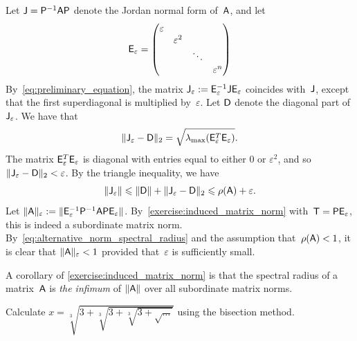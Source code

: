 \begin{solution}
    Let $\mathsf J = \mathsf P^{-1} \mathsf A \mathsf P$ denote the Jordan normal form of~$\mathsf A$,
    and let
    \[
        \mathsf E_{\varepsilon} =
        \begin{pmatrix}
            \varepsilon \\
        & \varepsilon^{2} &  \\
        & & \ddots & \\
        & & & \varepsilon^{n}
        \end{pmatrix}
    \]
    By~\cref{eq:preliminary_equation},
    the matrix $\mathsf J_{\varepsilon} := \mathsf E_{\varepsilon}^{-1} \mathsf J \mathsf E_{\varepsilon}$ coincides with~$\mathsf J$,
    except that the first superdiagonal is multiplied by~$\varepsilon$.
    Let $\mathsf D$ denote the diagonal part of $\mathsf J_{\varepsilon}$.
    We have that
    \[
        \lVert\mathsf J_{\varepsilon} - \mathsf D\rVert_2 = \sqrt{\lambda_{\max} (\mathsf E_{\varepsilon}^T \mathsf E_{\varepsilon})}.
    \]
    The matrix $\mathsf E_{\varepsilon}^T \mathsf E_{\varepsilon}$ is diagonal with entries equal to either 0 or $\varepsilon^2$,
    and so $\lVert\mathsf J_{\varepsilon} - \mathsf D\rVert_2 < \varepsilon$.
    By the triangle inequality, we have
    \begin{equation}
        \label{eq:alternative_norm_spectral_radius}
        \lVert\mathsf J_{\varepsilon}\rVert \leqslant \lVert\mathsf D\rVert + \lVert\mathsf J_{\varepsilon} - \mathsf D\rVert_2
        \leqslant \rho(\mathsf A) + \varepsilon.
    \end{equation}
    Let $\lVert\mathsf A\rVert_{\varepsilon} := \lVert\mathsf E_{\varepsilon}^{-1} \mathsf P^{-1} \mathsf A \mathsf P \mathsf E_{\varepsilon}\rVert$.
    By~\eqref{exercise:induced_matrix_norm} with~$\mathsf T = \mathsf P \mathsf E_{\varepsilon}$,
    this is indeed a subordinate matrix norm.
    By~\eqref{eq:alternative_norm_spectral_radius} and the assumption that~$\rho(\mathsf A) < 1$,
    it is clear that $\lVert\mathsf A\rVert_{\varepsilon} < 1$ provided that~$\varepsilon$ is sufficiently small.
\end{solution}
\begin{remark}
    A corollary of \cref{exercise:induced_matrix_norm} is that the spectral radius of a matrix~$\mathsf A$ is \emph{the infimum} of $\lVert\mathsf A\rVert$ over all subordinate matrix norms.
\end{remark}

\begin{exercise}
    Calculate $x = \sqrt[3]{3 + \sqrt[3]{3 + \sqrt[3]{3 + \sqrt{\dots}}}}$ using the bisection method.
\end{exercise}

